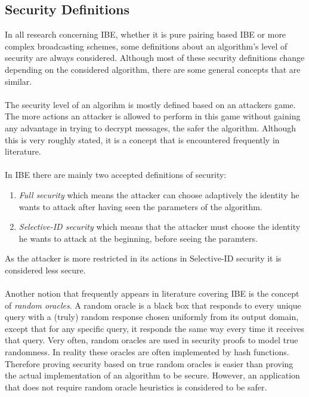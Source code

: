 \documentclass[journal]{IEEEtran}
\begin{document}
\subsection{Security Definitions}
In all research concerning IBE, whether it is pure pairing based IBE or more
complex broadcasting schemes, some definitions about an algorithm's level of
security are always considered. Although most of these security definitions
change depending on the considered algorithm, there are some general concepts
that are similar.\\
\\
The security level of an algorihm is mostly defined based on an attackers game.
The more actions an attacker is allowed to perform in this game without gaining
any advantage in trying to decrypt messages, the safer the algorithm. Although
this is very roughly stated, it is a concept that is encountered frequently in
literature.\\
\\
In IBE there are mainly two accepted definitions of security:
\begin{enumerate}
 \item \textit{Full security} which means the attacker can choose adaptively the
identity he wants to attack after having seen the parameters of the algorithm.
 \item \textit{Selective-ID security} which means that the attacker must choose
the identity he wants to attack at the beginning, before seeing the paramters.
\end{enumerate}
As the attacker is more restricted in its actions in Selective-ID security it
is considered less secure.~\cite{DelerableeIBBE}\\
\\
Another notion that frequently appears in literature covering IBE is the concept
of \textit{random oracles}. A random oracle is a black box that responds to
every unique query with a (truly) random response chosen uniformly from its
output domain, except that for any specific query, it responds the same way
every time it receives that query. Very often, random oracles are used in
security proofs to model true randomness. In reality these oracles are often
implemented by hash functions. Therefore proving security based on true random
oracles is easier than proving the actual implementation of an algorithm to be
secure. However, an application that does not require random oracle heuristics
is considered to be safer.~\cite{WikiOracle}
\end{document}
